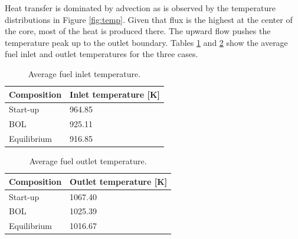 \documentclass{anstrans}
\begin{document}
	Heat transfer is dominated by advection as is observed by the temperature
	distributions in Figure \ref{fig:temp}. Given that flux is the highest
	at the center of the core, most of the heat is produced there. The upward
	flow pushes the temperature peak up to the outlet boundary. Tables
	\ref{table:inlet} and \ref{table:outlet} show the average
	fuel inlet and outlet temperatures for the three cases.
%	
\begin{table}[H]
	\centering
	\captionsetup{justification=centering}
	\caption{Average fuel inlet temperature.}
	\begin{tabular}{ll}
		\hline
		{Composition} & {Inlet temperature [K]}\\
		\hline
		Start-up & 964.85\\
		\gls{BOL} & 925.11\\
		Equilibrium & 916.85\\
		\hline
	\end{tabular}
	\label{table:inlet}
\end{table}	
%
\begin{table}[H]
	\centering
	\captionsetup{justification=centering}
	\caption{Average fuel outlet temperature.}
	\begin{tabular}{ll}
		\hline
		{Composition} & {Outlet temperature [K]}\\
		\hline
		Start-up & 1067.40\\
		\gls{BOL} & 1025.39\\
		Equilibrium & 1016.67\\
		\hline
	\end{tabular}
	\label{table:outlet}
\end{table}	
\end{document}
